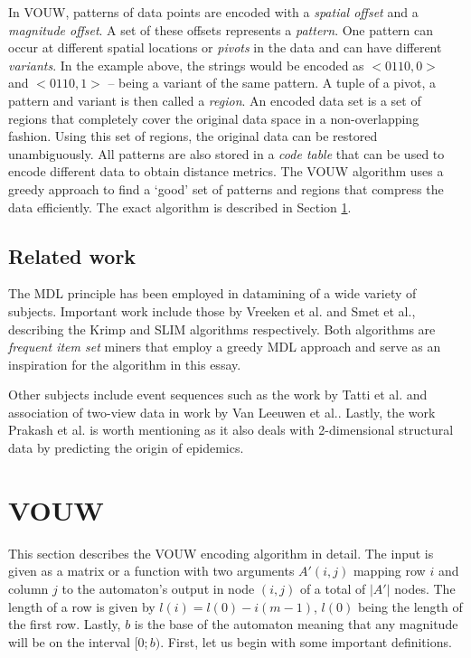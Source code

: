 \documentclass{llncs}
\begin{document}
In VOUW, patterns of data points are encoded with a \emph{spatial offset} and a \emph{magnitude offset}. A set of these offsets represents a \emph{pattern}. One pattern can occur at different spatial locations or \emph{pivots} in the data and can have different \emph{variants}. In the example above, the strings would be encoded as $<0110,0>$ and $<0110,1>$ -- being a variant of the same pattern.
A tuple of a pivot, a pattern and variant is then called a \emph{region}. An encoded data set is a set of regions that completely cover the original data space in a non-overlapping fashion. Using this set of regions, the original data can be restored unambiguously. All patterns are also stored in a \emph{code table} that can be used to encode different data to obtain distance metrics. The VOUW algorithm uses a greedy approach to find a `good' set of patterns and regions that compress the data efficiently. The exact algorithm is described in Section \ref{encoding}.

\subsection{Related work}
The MDL principle has been employed in datamining of a wide variety of subjects. Important work include those by Vreeken et al.\cite{krimp} and Smet et al.\cite{slim}, describing the Krimp and SLIM algorithms respectively. Both algorithms are \emph{frequent item set} miners that employ a greedy MDL approach and serve as an inspiration for the algorithm in this essay.

Other subjects include event sequences such as the work by Tatti et al.\cite{tatti} and association of two-view data in work by Van Leeuwen et al.\cite{leeuwen}.
Lastly, the work Prakash et al.\cite{prakash} is worth mentioning as it also deals with 2-dimensional structural data by predicting the origin of epidemics. 



\section{VOUW}\label{encoding}
This section describes the VOUW encoding algorithm in detail. The input is given as a matrix or a function with two arguments $A'(i,j)$ mapping row $i$ and column $j$ to the automaton's output in node $(i,j)$ of a total of $|A'|$ nodes. The length of a row is given by $l(i) = l(0)-i(m-1)$, $l(0)$ being the length of the first row. Lastly, $b$ is the base of the automaton meaning that any magnitude will be on the interval $[0;b)$. First, let us begin with some important definitions.
\end{document}
